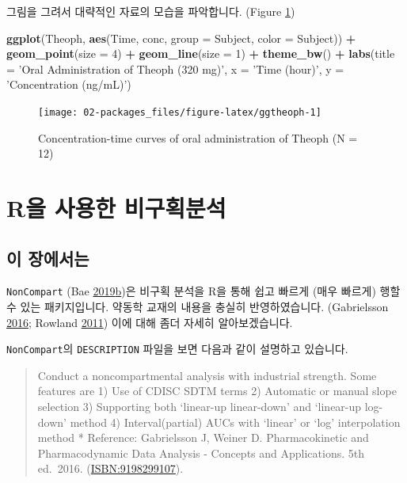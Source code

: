 \documentclass[12pt,]{krantz}
\newenvironment{Shaded}{\begin{snugshade}}{\end{snugshade}}
\newcommand{\DataTypeTok}[1]{\textcolor[rgb]{0.13,0.29,0.53}{#1}}
\newcommand{\DecValTok}[1]{\textcolor[rgb]{0.00,0.00,0.81}{#1}}
\newcommand{\KeywordTok}[1]{\textcolor[rgb]{0.13,0.29,0.53}{\textbf{#1}}}
\newcommand{\NormalTok}[1]{#1}
\newcommand{\OperatorTok}[1]{\textcolor[rgb]{0.81,0.36,0.00}{\textbf{#1}}}
\newcommand{\StringTok}[1]{\textcolor[rgb]{0.31,0.60,0.02}{#1}}
\begin{document}
그림을 그려서 대략적인 자료의 모습을 파악합니다. (Figure \ref{fig:ggtheoph})

\begin{Shaded}
\begin{Highlighting}[]
\KeywordTok{ggplot}\NormalTok{(Theoph, }\KeywordTok{aes}\NormalTok{(Time, conc, }\DataTypeTok{group =}\NormalTok{ Subject, }\DataTypeTok{color =}\NormalTok{ Subject)) }\OperatorTok{+}
\StringTok{  }\KeywordTok{geom_point}\NormalTok{(}\DataTypeTok{size =} \DecValTok{4}\NormalTok{) }\OperatorTok{+}\StringTok{ }
\StringTok{  }\KeywordTok{geom_line}\NormalTok{(}\DataTypeTok{size =} \DecValTok{1}\NormalTok{) }\OperatorTok{+}
\StringTok{  }\KeywordTok{theme_bw}\NormalTok{() }\OperatorTok{+}
\StringTok{  }\KeywordTok{labs}\NormalTok{(}\DataTypeTok{title =} \StringTok{'Oral Administration of Theoph (320 mg)'}\NormalTok{,}
       \DataTypeTok{x =} \StringTok{'Time (hour)'}\NormalTok{, }\DataTypeTok{y =} \StringTok{'Concentration (ng/mL)'}\NormalTok{)}
\end{Highlighting}
\end{Shaded}

\begin{figure}
\texttt{[image: 02-packages\_files/figure-latex/ggtheoph-1]} \caption{Concentration-time curves of oral administration of Theoph (N = 12)}\label{fig:ggtheoph}
\end{figure}

\hypertarget{noncompart}{%
\chapter{R을 사용한 비구획분석}\label{noncompart}}

\hypertarget{summary-noncompart}{%
\section{이 장에서는}\label{summary-noncompart}}

\texttt{NonCompart} (Bae \protect\hyperlink{ref-R-NonCompart}{2019}\protect\hyperlink{ref-R-NonCompart}{b})은 비구획 분석을 R을 통해 쉽고 빠르게 (매우 빠르게) 행할 수 있는 패키지입니다.
약동학 교재의 내용을 충실히 반영하였습니다. (Gabrielsson \protect\hyperlink{ref-gab}{2016}; Rowland \protect\hyperlink{ref-tozer}{2011})
이에 대해 좀더 자세히 알아보겠습니다.

\texttt{NonCompart}의 \texttt{DESCRIPTION} 파일을 보면 다음과 같이 설명하고 있습니다.

\begin{quote}
Conduct a noncompartmental analysis with industrial strength.
Some features are
1) Use of CDISC SDTM terms
2) Automatic or manual slope selection
3) Supporting both `linear-up linear-down' and `linear-up log-down' method
4) Interval(partial) AUCs with `linear' or `log' interpolation method
* Reference: Gabrielsson J, Weiner D. Pharmacokinetic and Pharmacodynamic Data Analysis - Concepts and Applications. 5th ed.~2016. (\url{ISBN:9198299107}).
\end{quote}
\end{document}
